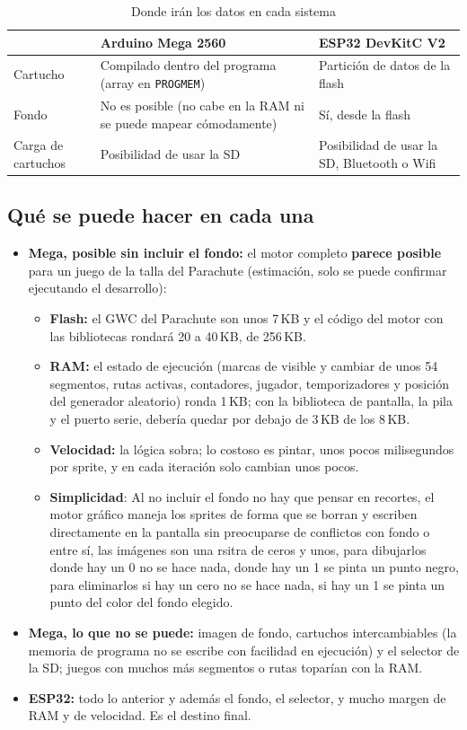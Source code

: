 \begin{table}[H]
	\centering
	\begin{tabular}{lp{5.3cm}p{5.3cm}}
		\toprule
		& Arduino Mega 2560 & ESP32 DevKitC V2 \\
		\midrule
		Cartucho & Compilado dentro del programa (array en \texttt{PROGMEM}) & Partición de datos de la flash \\
		Fondo & No es posible (no cabe en la RAM ni se puede mapear cómodamente) & Sí, desde la flash \\
		Carga de cartuchos & Posibilidad de usar la SD & Posibilidad de usar la SD,  Bluetooth o Wifi\\
		\bottomrule
	\end{tabular}
\caption{Donde irán los datos en cada sistema}
\label{tab:F6I01PlataformasDatos}
\end{table}


\subsection{Qué se puede hacer en cada una}
\label{sec:F6I01Posible}

\begin{itemize}
	\item \textbf{Mega, posible sin incluir el fondo:} el motor completo \textbf{parece posible} para un juego de la talla del Parachute (estimación, solo se puede confirmar ejecutando el desarrollo):
	\begin{itemize}
		\item \textbf{Flash:} el GWC del Parachute son unos 7\,KB y el código del motor con las bibliotecas rondará 20 a 40\,KB, de 256\,KB.
		\item \textbf{RAM:} el estado de ejecución (marcas de visible y cambiar de unos 54 segmentos, rutas activas, contadores, jugador, temporizadores y posición del generador aleatorio) ronda 1\,KB; con la biblioteca de pantalla, la pila y el puerto serie, debería quedar por debajo de 3\,KB de los 8\,KB.
		\item \textbf{Velocidad:} la lógica sobra; lo costoso es pintar, unos pocos milisegundos por sprite, y en cada iteración solo cambian unos pocos.
		\item \textbf{Simplicidad}: Al no incluir el fondo no hay que pensar en recortes, el motor gráfico maneja los sprites de forma que se borran y escriben directamente en la pantalla sin preocuparse de conflictos con fondo o entre sí, las imágenes son una rsitra de ceros y unos, para dibujarlos donde hay un 0 no se hace nada, donde hay un 1 se pinta un punto negro, para eliminarlos si hay un cero no se hace nada, si hay un 1 se pinta un punto del color del fondo elegido.
	\end{itemize}
	\item \textbf{Mega, lo que no se puede:} imagen de fondo, cartuchos intercambiables (la memoria de programa no se escribe con facilidad en ejecución) y el selector de la SD; juegos con muchos más segmentos o rutas toparían con la RAM.
	\item \textbf{ESP32:} todo lo anterior y además el fondo, el selector, y mucho margen de RAM y de velocidad. Es el destino final.
\end{itemize}

